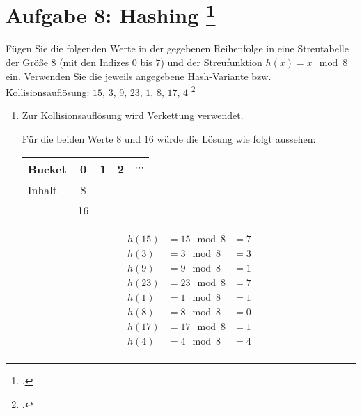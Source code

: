 \documentclass{lehramt-informatik-aufgabe}
\begin{document}
\section{Aufgabe 8: Hashing
\footcite[entnommen aus Algorithmen und
Datenstrukturen, Übungsblatt 5, Universität Würzburg]{aud:pu:7}}

Fügen Sie die folgenden Werte in der gegebenen Reihenfolge in eine
Streutabelle der Größe $8$ (mit den Indizes $0$ bis $7$) und der
Streufunktion $h(x) = x \mod 8$ ein. Verwenden Sie die jeweils angegebene
Hash-Variante bzw. Kollisionsauflösung: $15$, $3$, $9$, $23$, $1$, $8$,
$17$, $4$ \footcite[Staatsexamen Theoretische Informatik, Algorithmen
und Datenstrukturen, Realschulen, Herbst 2015, Thema 2 Aufgabe 1
(Auszug)]{examen:46115:2015:09}

\begin{enumerate}


\item {}

Zur Kollisionsauflösung wird Verkettung
verwendet.


Für die beiden Werte $8$ und $16$ würde die Lösung wie folgt aussehen:

\begin{center}
\begin{tabular}{l|cccc}
Bucket    & 0  & 1      & 2 & $\cdots$ \\\hline
Inhalt    & 8 \\
          & 16 \\
\end{tabular}
\end{center}

\begin{antwort}
{\footnotesize
\begin{equation*}
\begin{aligned}
h(15) &= 15 \mod 8 &= 7\\
h(3)  &= 3 \mod 8  &= 3\\
h(9)  &= 9 \mod 8  &= 1\\
h(23) &= 23 \mod 8 &= 7\\
h(1)  &= 1 \mod 8  &= 1\\
h(8)  &= 8 \mod 8  &= 0\\
h(17) &= 17 \mod 8 &= 1\\
h(4)  &= 4 \mod 8  &= 4\\
\end{aligned}
\end{equation*}}


\end{antwort}
\end{enumerate}
\end{document}
